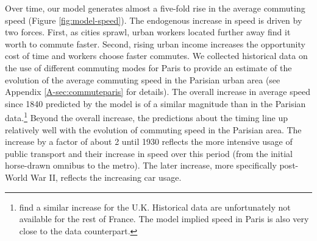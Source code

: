 \documentclass[./20250130-paper.tex]{subfiles}
\begin{document}
Over time, our model generates almost a five-fold rise in the average commuting speed (Figure \ref{fig:model-speed}). The endogenous increase in speed is driven by two forces. First, as cities sprawl, urban workers located further away find it worth to commute faster. Second, rising urban income increases the opportunity cost of time and workers choose faster commutes. We collected historical data on the use of different commuting modes for Paris to provide an estimate of the evolution of the average commuting speed in the Parisian urban area (see Appendix \ref{A-sec:commuteparis} for details). The overall increase in average speed since 1840 predicted by the model is of a similar magnitude than in the Parisian data.\footnote{\cite{milessefton2020} find a similar increase for the U.K. Historical data are unfortunately not available for the rest of France. The model implied speed in Paris is also very close to the data counterpart.} Beyond the overall increase, the predictions about the timing line up relatively well with the evolution of commuting speed in the Parisian area. The increase by a factor of about 2 until 1930 reflects the more intensive usage of public transport and their increase in speed over this period (from the initial horse-drawn omnibus to the metro). The later increase, more specifically post-World War II, reflects the increasing car usage.  %




\end{document}
